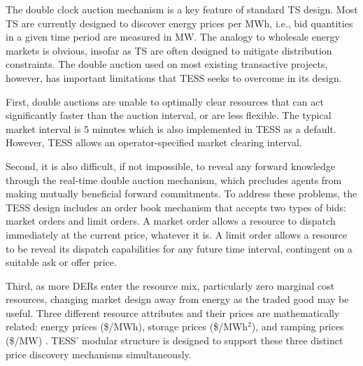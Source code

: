 The double clock auction mechanism is a key feature of standard TS design. Most TS are currently designed to discover energy prices per MWh, i.e., bid quantities in a given time period are measured in MW.  The analogy to wholesale energy markets is obvious, insofar as TS are often designed to mitigate distribution constraints.
The double auction used on most existing transactive projects, however, has important limitations that TESS seeks to overcome in its design. 

First, double auctions are unable to optimally clear resources that can act significantly faster than the auction interval, or are less flexible. The typical market interval is 5 minutes which is also implemented in TESS as a default. However, TESS allows an operator-specified market clearing interval.

Second, it is also difficult, if not impossible, to reveal any forward knowledge through the real-time double auction  mechanism, which precludes agents from making mutually beneficial forward commitments. To address these problems, the TESS design includes an order book mechanism that accepts two types of bids: market orders and limit orders. A market order allows a resource to dispatch immediately at the current price, whatever it is. A limit order allows a resource to be reveal its dispatch capabilities for any future time interval, contingent on a suitable ask or offer price.

Third, as more DERs enter the resource mix, particularly zero marginal cost resources, changing market design away from energy as the traded good may be useful. Three different resource attributes and their prices are mathematically related: energy prices (\$/MWh), storage prices (\$/MWh$^2$), and ramping prices (\$/MW) \citep{chassin2017thesis}. TESS' modular structure is designed to support these three distinct price discovery mechanisms simultaneously. 

